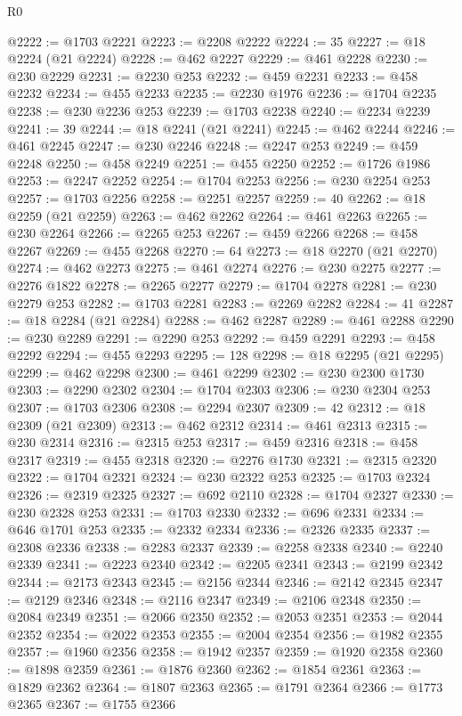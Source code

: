 \begin{lexlean}{R0}
\begin{coremodule}
@2222 := @1703 @2221
@2223 := @2208 @2222
@2224 := 35
@2227 := @18 @2224 (@21 @2224)
@2228 := @462 @2227
@2229 := @461 @2228
@2230 := @230 @2229
@2231 := @2230 @253
@2232 := @459 @2231
@2233 := @458 @2232
@2234 := @455 @2233
@2235 := @2230 @1976
@2236 := @1704 @2235
@2238 := @230 @2236 @253
@2239 := @1703 @2238
@2240 := @2234 @2239
@2241 := 39
@2244 := @18 @2241 (@21 @2241)
@2245 := @462 @2244
@2246 := @461 @2245
@2247 := @230 @2246
@2248 := @2247 @253
@2249 := @459 @2248
@2250 := @458 @2249
@2251 := @455 @2250
@2252 := @1726 @1986
@2253 := @2247 @2252
@2254 := @1704 @2253
@2256 := @230 @2254 @253
@2257 := @1703 @2256
@2258 := @2251 @2257
@2259 := 40
@2262 := @18 @2259 (@21 @2259)
@2263 := @462 @2262
@2264 := @461 @2263
@2265 := @230 @2264
@2266 := @2265 @253
@2267 := @459 @2266
@2268 := @458 @2267
@2269 := @455 @2268
@2270 := 64
@2273 := @18 @2270 (@21 @2270)
@2274 := @462 @2273
@2275 := @461 @2274
@2276 := @230 @2275
@2277 := @2276 @1822
@2278 := @2265 @2277
@2279 := @1704 @2278
@2281 := @230 @2279 @253
@2282 := @1703 @2281
@2283 := @2269 @2282
@2284 := 41
@2287 := @18 @2284 (@21 @2284)
@2288 := @462 @2287
@2289 := @461 @2288
@2290 := @230 @2289
@2291 := @2290 @253
@2292 := @459 @2291
@2293 := @458 @2292
@2294 := @455 @2293
@2295 := 128
@2298 := @18 @2295 (@21 @2295)
@2299 := @462 @2298
@2300 := @461 @2299
@2302 := @230 @2300 @1730
@2303 := @2290 @2302
@2304 := @1704 @2303
@2306 := @230 @2304 @253
@2307 := @1703 @2306
@2308 := @2294 @2307
@2309 := 42
@2312 := @18 @2309 (@21 @2309)
@2313 := @462 @2312
@2314 := @461 @2313
@2315 := @230 @2314
@2316 := @2315 @253
@2317 := @459 @2316
@2318 := @458 @2317
@2319 := @455 @2318
@2320 := @2276 @1730
@2321 := @2315 @2320
@2322 := @1704 @2321
@2324 := @230 @2322 @253
@2325 := @1703 @2324
@2326 := @2319 @2325
@2327 := @692 @2110
@2328 := @1704 @2327
@2330 := @230 @2328 @253
@2331 := @1703 @2330
@2332 := @696 @2331
@2334 := @646 @1701 @253
@2335 := @2332 @2334
@2336 := @2326 @2335
@2337 := @2308 @2336
@2338 := @2283 @2337
@2339 := @2258 @2338
@2340 := @2240 @2339
@2341 := @2223 @2340
@2342 := @2205 @2341
@2343 := @2199 @2342
@2344 := @2173 @2343
@2345 := @2156 @2344
@2346 := @2142 @2345
@2347 := @2129 @2346
@2348 := @2116 @2347
@2349 := @2106 @2348
@2350 := @2084 @2349
@2351 := @2066 @2350
@2352 := @2053 @2351
@2353 := @2044 @2352
@2354 := @2022 @2353
@2355 := @2004 @2354
@2356 := @1982 @2355
@2357 := @1960 @2356
@2358 := @1942 @2357
@2359 := @1920 @2358
@2360 := @1898 @2359
@2361 := @1876 @2360
@2362 := @1854 @2361
@2363 := @1829 @2362
@2364 := @1807 @2363
@2365 := @1791 @2364
@2366 := @1773 @2365
@2367 := @1755 @2366

\end{coremodule}
\end{lexlean}
